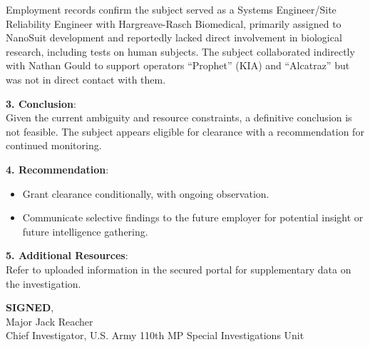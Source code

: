 \documentclass[a4paper,12pt]{letter}
\begin{document}
	Employment records confirm the subject served as a Systems Engineer/Site Reliability Engineer with Hargreave-Rasch Biomedical, primarily assigned to NanoSuit development and reportedly lacked direct involvement in biological research, including tests on human subjects. The subject collaborated indirectly with Nathan Gould to support operators “Prophet” (KIA) and “Alcatraz” but was not in direct contact with them.
	
	\vspace{0.5cm}
	
	\noindent
	\textbf{3. Conclusion}: \\
	Given the current ambiguity and resource constraints, a definitive conclusion is not feasible. The subject appears eligible for clearance with a recommendation for continued monitoring.
	
	\vspace{0.5cm}
	
	\noindent
	\textbf{4. Recommendation}: \\
	\begin{itemize}
		\item Grant clearance conditionally, with ongoing observation.
		\item Communicate selective findings to the future employer for potential insight or future intelligence gathering.
	\end{itemize}
	
	\vspace{0.5cm}
	
	\noindent
	\textbf{5. Additional Resources}: \\
	Refer to uploaded information in the secured portal for supplementary data on the investigation.
	
	\vspace{1cm}
	
	\noindent
	\textbf{SIGNED}, \\
	Major Jack Reacher \\
	Chief Investigator, U.S. Army 110th MP Special Investigations Unit
	
\end{document}
